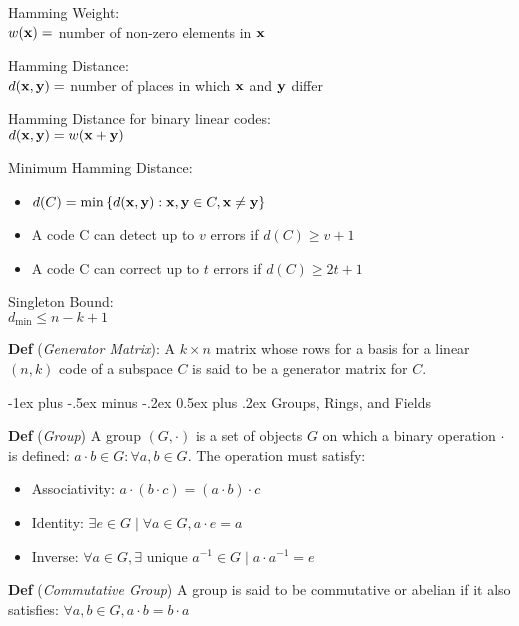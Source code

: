 \documentclass[12pt,landscape]{article}
\makeatletter
\renewcommand{\section}{\@startsection{section}{1}{0mm}%
                                {-1ex plus -.5ex minus -.2ex}%
                                {0.5ex plus .2ex}%
                                {\normalfont\normalsize\bfseries}}
\newcommand{\tab}{\hspace{.02\textwidth}}
\newcommand{\defn}[1]{\textbf{Def} (\emph{#1})}
\newcommand{\set}[1]{\left\{ #1 \right\}}
\makeatother
\begin{document}
\begin{multicols*}{3}
Hamming Weight:\\
\tab $w(\vb{x}) =$ number of non-zero elements in $\vb{x}$

Hamming Distance:\\
\tab $d(\vb{x}, \vb{y}) =$ number of places in which $\vb{x}$ and $\vb{y}$ differ

Hamming Distance for binary linear codes:\\
\tab $d(\vb{x}, \vb{y}) = w(\vb{x} + \vb{y})$

Minimum Hamming Distance:\\
\vspace{-0.5em}
\begin{itemize}[itemsep=0em]
    \item $d(C) = \min{\set{d(\vb{x}, \vb{y}) : \vb{x}, \vb{y} \in C, \vb{x} \neq \vb{y}}}$
    \item A code C can detect up to $v$ errors if $d(C) \geq v + 1$
    \item A code C can correct up to $t$ errors if $d(C) \geq 2t + 1$
\end{itemize}

Singleton Bound:\\
\tab $d_\text{min} \leq n - k + 1$

\defn{Generator Matrix}: A $k\times n$ matrix whose rows for a basis for a linear $(n,k)$ code of a subspace $C$ is said to be a generator matrix for $C$.

\section{Groups, Rings, and Fields}

\defn{Group} A group $(G, \cdot)$ is a set of objects $G$ on which a binary operation $\cdot$ is defined: $a \cdot b \in G : \forall a,b \in G$. The operation must satisfy:
\vspace{-0.5em}
\begin{itemize}[itemsep=0em]
    \item Associativity: $a \cdot (b \cdot c) = (a \cdot b) \cdot c$
    \item Identity: $\exists e \in G \mid \forall a \in G, a \cdot e = a$
    \item Inverse: $\forall a \in G, \exists \text{ unique } a^{-1} \in G \mid a \cdot a^{-1} = e$
\end{itemize}

\defn{Commutative Group} A group is said to be commutative or abelian if it also satisfies: $\forall a,b \in G, a \cdot b = b \cdot a$


\end{multicols*}
\end{document}
